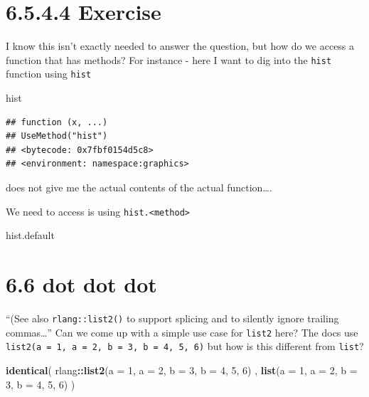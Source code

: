 \documentclass[]{book}
\newenvironment{Shaded}{\begin{snugshade}}{\end{snugshade}}
\newcommand{\DataTypeTok}[1]{\textcolor[rgb]{0.13,0.29,0.53}{#1}}
\newcommand{\DecValTok}[1]{\textcolor[rgb]{0.00,0.00,0.81}{#1}}
\newcommand{\KeywordTok}[1]{\textcolor[rgb]{0.13,0.29,0.53}{\textbf{#1}}}
\newcommand{\NormalTok}[1]{#1}
\newcommand{\OperatorTok}[1]{\textcolor[rgb]{0.81,0.36,0.00}{\textbf{#1}}}
\begin{document}
\hypertarget{exercise-3}{%
\section*{6.5.4.4 Exercise}\label{exercise-3}}

I know this isn't exactly needed to answer the question, but how do we access a function that has methods? For instance - here I want to dig into the \texttt{hist} function using \texttt{hist}

\begin{Shaded}
\begin{Highlighting}[]
\NormalTok{hist}
\end{Highlighting}
\end{Shaded}

\begin{verbatim}
## function (x, ...) 
## UseMethod("hist")
## <bytecode: 0x7fbf0154d5c8>
## <environment: namespace:graphics>
\end{verbatim}

does not give me the actual contents of the actual function\ldots{}.

We need to access is using \texttt{hist.\textless{}method\textgreater{}}

\begin{Shaded}
\begin{Highlighting}[]
\NormalTok{hist.default}
\end{Highlighting}
\end{Shaded}

\hypertarget{dot-dot-dot}{%
\section*{6.6 dot dot dot}\label{dot-dot-dot}}

``(See also \texttt{rlang::list2()} to support splicing and to silently ignore trailing commas\ldots{}'' Can we come up with a simple use case for \texttt{list2} here? The docs use \texttt{list2(a\ =\ 1,\ a\ =\ 2,\ b\ =\ 3,\ b\ =\ 4,\ 5,\ 6)} but how is this different from \texttt{list}?

\begin{Shaded}
\begin{Highlighting}[]
\KeywordTok{identical}\NormalTok{(}
\NormalTok{  rlang}\OperatorTok{::}\KeywordTok{list2}\NormalTok{(}\DataTypeTok{a =} \DecValTok{1}\NormalTok{, }\DataTypeTok{a =} \DecValTok{2}\NormalTok{, }\DataTypeTok{b =} \DecValTok{3}\NormalTok{, }\DataTypeTok{b =} \DecValTok{4}\NormalTok{, }\DecValTok{5}\NormalTok{, }\DecValTok{6}\NormalTok{) ,}
  \KeywordTok{list}\NormalTok{(}\DataTypeTok{a =} \DecValTok{1}\NormalTok{, }\DataTypeTok{a =} \DecValTok{2}\NormalTok{, }\DataTypeTok{b =} \DecValTok{3}\NormalTok{, }\DataTypeTok{b =} \DecValTok{4}\NormalTok{, }\DecValTok{5}\NormalTok{, }\DecValTok{6}\NormalTok{)}
\NormalTok{)}
\end{Highlighting}
\end{Shaded}
\end{document}
